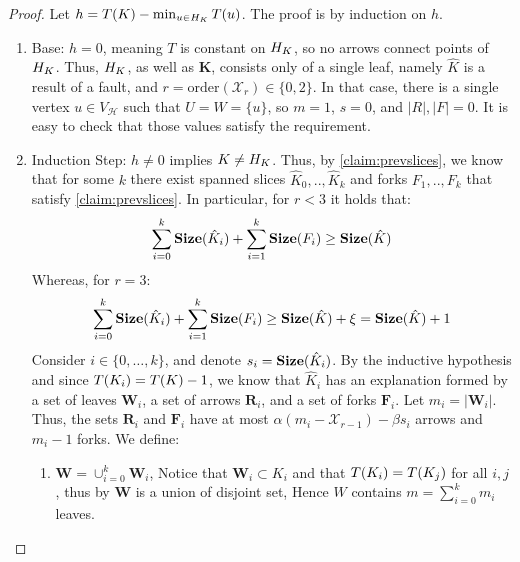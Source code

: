   \begin{proof}
    Let $h = T(K) - \min_{u \in H_{K}}T(u)$. The proof is by induction on $h$. 
    \begin{enumerate}
      \item Base: $h=0$, meaning $T$ is constant on $H_{K}$, so no arrows connect points of $H_{K}$. Thus, $H_{K}$, as well as $\mathbf{K}$, consists only of a single leaf, namely $\hat{K}$ is a result of a fault, and $r = \text{order}(\mathcal{X}_{r}) \in \{0,2\}$. In that case, there is a single vertex $u \in V_{\mathcal{H}}$ such that $U = W = \{u\}$, so $m=1$, $s=0$, and $|R|, |F| = 0$. It is easy to check that those values satisfy the requirement. 
      \item Induction Step: $h \neq 0$ implies $K \neq H_{K}$. Thus, by \cref{claim:prevslices}, we know that for some $k$ there exist spanned slices $\hat{K}_{0}, .., \hat{K}_{k}$ and forks $F_{1},..,F_{k}$ that satisfy \cref{claim:prevslices}. In particular, for $r < 3$ it holds that: 
        \begin{equation*}
          \begin{split}
            \sum_{i=0}^{k}\mathbf{Size}(\hat{K}_{i}) +  \sum^{k}_{i=1}\mathbf{Size}(F_{i}) \ge \mathbf{Size}(\hat{K})  
          \end{split}
        \end{equation*}
        Whereas, for $r=3$: 
        \begin{equation*}
          \begin{split}
            \sum_{i=0}^{k}\mathbf{Size}(\hat{K}_{i}) +  \sum^{k}_{i=1}\mathbf{Size}(F_{i}) \ge \mathbf{Size}(\hat{K}) + \xi = \mathbf{Size}(\hat{K}) + 1 
          \end{split}
        \end{equation*}
        Consider $i \in \{0, \ldots, k\}$, and denote $s_{i} = \mathbf{Size}(\hat{K}_{i})$. By the inductive hypothesis and since $T(K_{i}) = T(K) - 1$, we know that $\hat{K}_{i}$ has an explanation formed by a set of leaves $\mathbf{W}_{i}$, a set of arrows $\mathbf{R}_{i}$, and a set of forks $\mathbf{F}_{i}$. Let $m_{i} = |\mathbf{W}_{i}|$. Thus, the sets $\mathbf{R}_{i}$ and $\mathbf{F}_{i}$ have at most $\alpha (m_{i} - \mathcal{X}_{r-1}) - \beta s_{i}$ arrows and $m_{i} - 1$ forks. We define:
        \begin{enumerate}
          \item $\mathbf{W} = \cup_{i=0}^{k} \mathbf{W}_{i}$, Notice that $\mathbf{W}_{i} \subset K_{i}$ and that $T(K_{i}) = T(K_{j})$ for all $i,j$, thus by  $\mathbf{W}$ is a union of disjoint set, Hence $W$ contains  $m = \sum_{i=0}^{k}m_{i}$ leaves. 

\end{enumerate}
\end{enumerate}
\end{proof}
